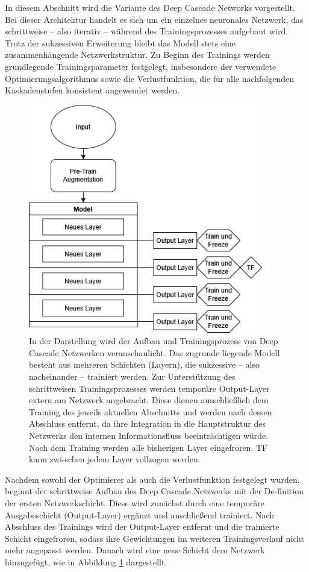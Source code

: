 In diesem Abschnitt wird die Variante des Deep Cascade Networks vorgestellt. Bei dieser Architektur handelt es sich um ein einzelnes neuronales 
Netzwerk, das schrittweise – also iterativ – während des Trainingsprozesses aufgebaut wird. Trotz der sukzessiven Erweiterung bleibt das Modell 
stets eine zusammenhängende Netzwerkstruktur. Zu Beginn des Trainings werden grundlegende Trainingsparameter festgelegt, insbesondere der 
verwendete Optimierungsalgorithmus sowie die Verlustfunktion, die für alle nachfolgenden Kaskadenstufen konsistent 
angewendet werden.

\begin{figure}[htpb]
    \centering
    \includegraphics[height=10cm]{../../Graphiken/deepcascade_2.png}
    \caption{\label{fig:deepcascade}
    \small{In der Darstellung wird der Aufbau und Trainingsprozess von Deep Cascade Netzwerken veranschaulicht. Das zugrunde liegende Modell 
    besteht aus mehreren Schichten (Layern), die sukzessive – also nacheinander – trainiert werden. Zur Unterstützung des schrittweisen 
    Trainingsprozesses werden temporäre Output-Layer extern am Netzwerk angebracht. Diese dienen ausschließlich dem Training 
    des jeweils aktuellen Abschnitts und werden nach dessen Abschluss entfernt, da ihre Integration in die Hauptstruktur des Netzwerks den 
    internen Informationsfluss beeinträchtigen würde. Nach dem Training werden alle bisherigen Layer eingefroren. TF kann zwi-schen jedem Layer 
    vollzogen werden.}}
\end{figure}

Nachdem sowohl der Optimierer als auch die Verlustfunktion festgelegt wurden, beginnt der schrittweise Aufbau des Deep Cascade Netzwerks mit der 
De-finition der ersten Netzwerkschicht. Diese wird zunächst durch eine temporäre Ausgabeschicht (Output-Layer) ergänzt und anschließend trainiert. 
Nach Abschluss des Trainings wird der Output-Layer entfernt und die trainierte Schicht eingefroren, sodass ihre Gewichtungen im weiteren 
Trainingsverlauf nicht mehr angepasst werden. Danach wird eine neue Schicht dem Netzwerk hinzugefügt, wie in Abbildung 
\ref{fig:deepcascade} dargestellt.

